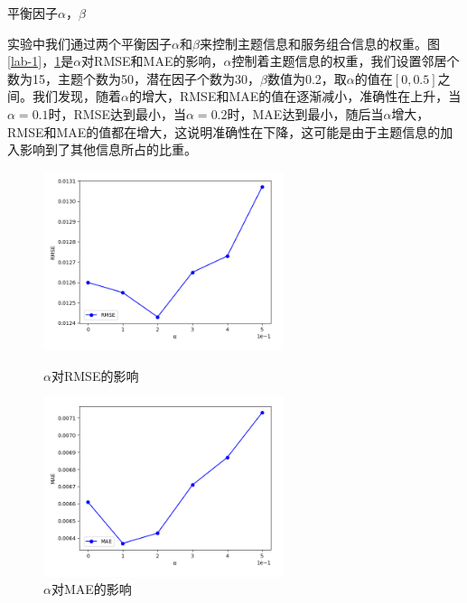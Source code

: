 \documentclass[master,winfonts]{njuthesis}
\begin{document}
\begin{arabicenum}
\item 平衡因子$\alpha$，$\beta$

实验中我们通过两个平衡因子$\alpha$和$\beta$来控制主题信息和服务组合信息的权重。图\ref{lab-1}，\ref{lab-2}是$\alpha$对RMSE和MAE的影响，$\alpha$控制着主题信息的权重，我们设置邻居个数为15，主题个数为50，潜在因子个数为30，$\beta$数值为0.2，取$\alpha$的值在$[0,0.5]$之间。我们发现，随着$\alpha$的增大，RMSE和MAE的值在逐渐减小，准确性在上升，当$\alpha=0.1$时，RMSE达到最小，当$\alpha=0.2$时，MAE达到最小，随后当$\alpha$增大，RMSE和MAE的值都在增大，这说明准确性在下降，这可能是由于主题信息的加入影响到了其他信息所占的比重。
\begin{figure}[h]
\centering
\begin{minipage}[t]{0.48\textwidth}
\centering
\includegraphics[width=7cm]{alpha_a.png}
\caption{$\alpha$对RMSE的影响}\label{lab-1}
\end{minipage}
\begin{minipage}[t]{0.48\textwidth}
\centering
\includegraphics[width=7cm]{alpha_b.png}
\caption{$\alpha$对MAE的影响}\label{lab-2}
\end{minipage}
\end{figure}


\end{arabicenum}
\end{document}
